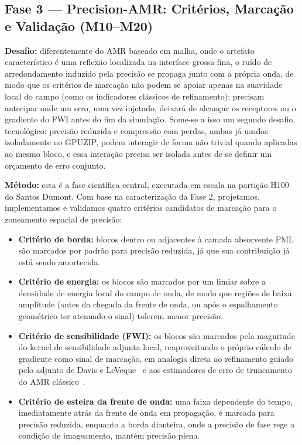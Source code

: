 \documentclass[12pt,a4paper]{article}
\begin{document}
\subsection{Fase 3 --- Precision-AMR: Critérios, Marcação e Validação
(M10--M20)}

\textbf{Desafio:} diferentemente do AMR baseado em malha, onde o artefato
característico é uma reflexão localizada na interface grossa-fina, o ruído
de arredondamento induzido pela precisão se propaga junto com a própria
onda, de modo que os critérios de marcação não podem se apoiar apenas na
suavidade local do campo (como os indicadores clássicos de refinamento);
precisam antecipar onde um erro, uma vez injetado, deixará de alcançar os
receptores ou o gradiente do FWI antes do fim da simulação. Some-se a isso
um segundo desafio, tecnológico: precisão reduzida e compressão com perdas,
ambas já usadas isoladamente no GPUZIP, podem interagir de forma não
trivial quando aplicadas ao mesmo bloco, e essa interação precisa ser
isolada antes de se definir um orçamento de erro conjunto.

\textbf{Método:} esta é a fase científica central, executada em escala na
partição H100 do Santos Dumont. Com base na caracterização da Fase 2,
projetamos, implementamos e validamos quatro critérios candidatos de
marcação para o zoneamento espacial de precisão:

\begin{itemize}
  \item \textbf{Critério de borda:} blocos dentro ou adjacentes à camada
        absorvente PML são marcados por padrão para precisão reduzida, já
        que sua contribuição já está sendo amortecida.
  \item \textbf{Critério de energia:} os blocos são marcados por um
        limiar sobre a densidade de energia local do campo de onda, de
        modo que regiões de baixa amplitude (antes da chegada da frente
        de onda, ou após o espalhamento geométrico ter atenuado o sinal)
        tolerem menor precisão.
  \item \textbf{Critério de sensibilidade (FWI):} os blocos são marcados
        pela magnitude do kernel de sensibilidade adjunta local,
        reaproveitando o próprio cálculo de gradiente como sinal de
        marcação, em analogia direta ao refinamento guiado pelo adjunto
        de Davis e LeVeque~\cite{davis2015adjoint} e aos estimadores de
        erro de truncamento do AMR clássico~\cite{berger1989amr}.
  \item \textbf{Critério de esteira da frente de onda:} uma faixa
        dependente do tempo, imediatamente atrás da frente de onda em
        propagação, é marcada para precisão reduzida, enquanto a borda
        dianteira, onde a precisão de fase rege a condição de
        imageamento, mantém precisão plena.
\end{itemize}
\end{document}
